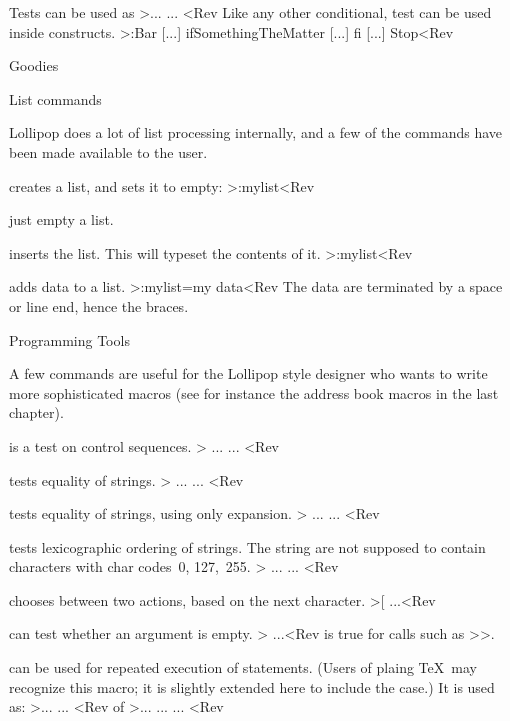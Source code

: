 Tests can be used as \Ver>\ifSomethingTheMatter ... \else ... \fi<Rev
Like any other conditional, test can be used inside constructs.
\Ver>\DefineFoo:Bar [...]
 ifSomethingTheMatter [...] fi
 [...] Stop<Rev

\Section Goodies

\SubSection List commands

Lollipop does a lot of list processing internally, and a few
of the commands have been made available to the user.

\Description\item {}
creates a list, and sets it to empty:
 \Ver>\NewList:mylist<Rev
 \item {}
just empty a list.
 \item {}
inserts the list. This will typeset the contents of it.
 \Ver>\TheList:mylist<Rev 
 \item {}
adds data to a list. \Ver>\AppendToList:mylist={my data}<Rev
The data are terminated by a space or line end, hence the braces.
\>

\SubSection Programming Tools

A few commands are useful for the Lollipop style designer who wants
to write more sophisticated macros (see for instance the address book
macros in the last chapter).

\Description\item {}
is a test on control sequences.
 \Ver>\if{} ... \else ... \fi<Rev
 \item {}
tests equality of strings.
 \Ver>\if{} ... \else ... \fi<Rev
 \item {}
tests equality of strings, using only expansion.
 \Ver>\if{} ... \else ... \fi<Rev
 \item {}
tests lexicographic ordering of strings. The string are not supposed
to contain characters with char codes~0, 127,~255.
 \Ver>\if{} ... \else ... \fi<Rev
 \item {}
chooses between two actions, based on the next character.
 \Ver>\if\NextChar[{\macro}{\macro[default]} ...<Rev
 \item {}
can test whether an argument is empty.
 \Ver>\if{} ...<Rev
is true for calls such as \ver>\macro{}>.
 \item{}
can be used for repeated execution of statements. (Users of plaing
\TeX\ may recognize this macro; it is slightly extended here
to include the  case.) It is
used as:
 \Ver>\loop ... \if ... \repeat<Rev
of \Ver>\loop ... \if ... \else ... \repeat<Rev



